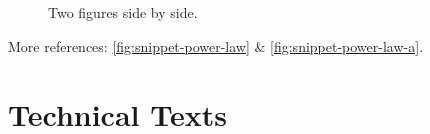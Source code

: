 {    \begin{figure}
        \centering
        \qquad
        \caption[]{Two figures side by side.}
        \label{fig:snippet-power-law}
    \end{figure}
    
    More references: \autoref{fig:snippet-power-law} \& \autoref{fig:snippet-power-law-a}.

    \section*{Technical Texts}

}
